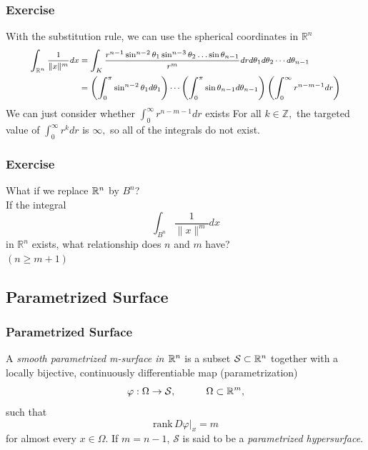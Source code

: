 \documentclass[12pt, t]{beamer}
\renewcommand{\emph}[1]{{\color{Turquoise3}\textsl{#1}}}
\newcommand{\nullspace}{~\\[15pt]}
\begin{document}
\begin{frame}
    \frametitle{Exercise}
    With the substitution rule, we can use the spherical coordinates in $\mathbb{R}^{n}$
    \[
        \footnotesize
        \begin{aligned}
            \int_{\mathbb{R}^{n}} \frac{1}{\|x\|^{m}} d x & =\int_{K} \frac{r^{n-1} \sin ^{n-2} \theta_{1} \sin ^{n-3} \theta_{2} \ldots \sin \theta_{n-1}}{r^{m}} d r d \theta_{1} d \theta_{2} \cdots d \theta_{n-1}                      \\
                                                          & =\left(\int_{0}^{\pi} \sin ^{n-2} \theta_{1} d \theta_{1}\right) \cdots\left(\int_{0}^{\pi} \sin \theta_{n-1} d \theta_{n-1}\right)\left(\int_{0}^{\infty} r^{n-m-1} d r\right)
        \end{aligned}
    \]
    We can just consider whether $\int_{0}^{\infty} r^{n-m-1} d r$ exists For all $k \in \mathbb{Z},$ the targeted value of $\int_{0}^{\infty} r^{k} d r$ is $\infty,$ so all of the integrals do not exist.
\end{frame}

\begin{frame}
    \frametitle{Exercise}
    What if we replace $\mathbb{R}^n$ by $B^n$?
    \nullspace
    If the integral $$\int_{B^n} \frac{1}{\|x\|^{m}} d x$$ in $\mathbb{R}^{n}$ exists, what relationship does $n$ and $m$ have?
    \nullspace
    \pause $(n \geq m+1)$
\end{frame}

\subsection{Parametrized Surface}
\begin{frame}
    \frametitle{Parametrized Surface}
    A \emph{smooth parametrized m-surface in $\mathbb{R}^n$} is a subset $\mathcal{S}\subset\mathbb{R}^n$ together with a locally bijective, continuously dif{}ferentiable map (parametrization)
    \[\varphi:\Omega\to\mathcal{S},\qquad\quad
        \Omega\subset\mathbb{R}^m,\]
    such that
    \[\text{rank}\,D\varphi|_x=m\]
    for almost every $x\in\Omega$. If $m=n-1$, $\mathcal{S}$ is said to be a \emph{parametrized hypersurface}.
\end{frame}
\end{document}
